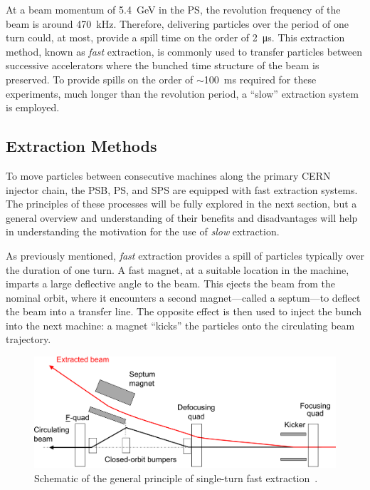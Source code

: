 \documentclass[a4paper,twoside,11pt]{report}
\begin{document}
At a beam momentum of \qty{5.4}{\giga\electronvolt} in the PS, the revolution frequency of the beam is around \qty{470}{kHz}. Therefore, delivering particles over the period of one turn could, at most, provide a spill time on the order of \qty{2}{\micro\second}. This extraction method, known as \textit{fast} extraction, is commonly used to transfer particles between successive accelerators where the bunched time structure of the beam is preserved. To provide spills on the order of $\sim$\qty{100}{\ms} required for these experiments, much longer than the revolution period, a ``slow'' extraction system is employed.

\subsection{Extraction Methods}

To move particles between consecutive machines along the primary CERN injector chain, the PSB, PS, and SPS are equipped with fast extraction systems. The principles of these processes will be fully explored in the next section, but a general overview and understanding of their benefits and disadvantages will help in understanding the motivation for the use of \textit{slow} extraction.

As previously mentioned, \textit{fast} extraction provides a spill of particles typically over the duration of one turn. A fast magnet, at a suitable location in the machine, imparts a large deflective angle to the beam. This ejects the beam from the nominal orbit, where it encounters a second magnet---called a septum---to deflect the beam into a transfer line. The opposite effect is then used to inject the bunch into the next machine: a magnet ``kicks'' the particles onto the circulating beam trajectory.

\begin{figure}[h]
  \centering
  \includegraphics[width=\linewidth]{fast.png}
  \caption{Schematic of the general principle of single-turn fast extraction~\cite{Fraser:CAS}.}\label{fig:fast_diagram}
\end{figure}
\end{document}
